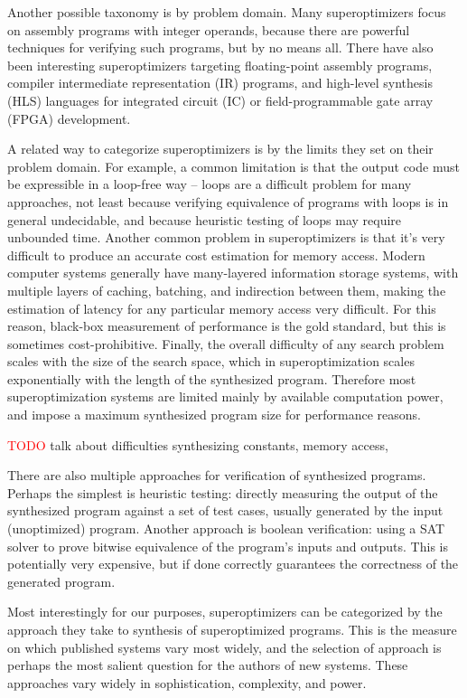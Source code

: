 \documentclass[12pt,twoside]{reedthesis}
\newcommand{\red}[1]{\textcolor{red}{#1}}
\newcommand{\addressed}[2]{{#1}}
\begin{document}
Another possible taxonomy is by problem domain.
Many superoptimizers focus on assembly programs with integer operands, because there are powerful techniques for verifying such programs, but by no means all.
There have also been interesting superoptimizers targeting 
    floating-point assembly programs, 
    compiler intermediate representation (IR) programs, 
    and high-level synthesis (HLS) languages for integrated circuit (IC) or field-programmable gate array (FPGA) development.

A related way to categorize superoptimizers is by the limits they set on their problem domain.
For example, a common limitation is that the output code must be expressible in a loop-free way
    -- loops are a difficult problem for many approaches,
        not least because verifying equivalence of programs with loops is in general undecidable,
        and because heuristic testing of loops may require unbounded time.
Another common problem in superoptimizers is that it's very difficult to produce an accurate cost estimation for memory access.
    Modern computer systems generally have many-layered information storage systems, with multiple layers of caching, batching, and indirection between them, making the estimation of latency for any particular memory access very difficult.
    For this reason, black-box measurement of performance is the gold standard, but this is sometimes cost-prohibitive.
Finally, the overall difficulty of any search problem scales with the size of the search space, which in superoptimization scales exponentially with the length of the synthesized program.
    Therefore most superoptimization systems are limited mainly by available computation power, and impose a maximum synthesized program size for performance reasons.

\red{TODO} talk about difficulties synthesizing constants, memory access, %

There are also multiple approaches for verification of synthesized programs.
Perhaps the simplest is heuristic testing: 
    directly measuring the output of the synthesized program against a set of test cases, usually generated by the input (unoptimized) program.
Another approach is boolean verification: using a SAT solver to prove bitwise equivalence of the program's inputs and outputs.
This is potentially very expensive, but if done correctly guarantees the correctness of the generated program. 

Most interestingly for our purposes, superoptimizers can be categorized by the approach they take to synthesis of superoptimized programs.
This is the measure on which published systems vary most widely, and the selection of approach is
    \addressed{perhaps}{I've noticed this throughout--you can drop a lot of these qualifiers to make it sound more forceful}
    the most salient question for the authors of new systems.
These approaches vary widely in sophistication, complexity, and power.
\end{document}
